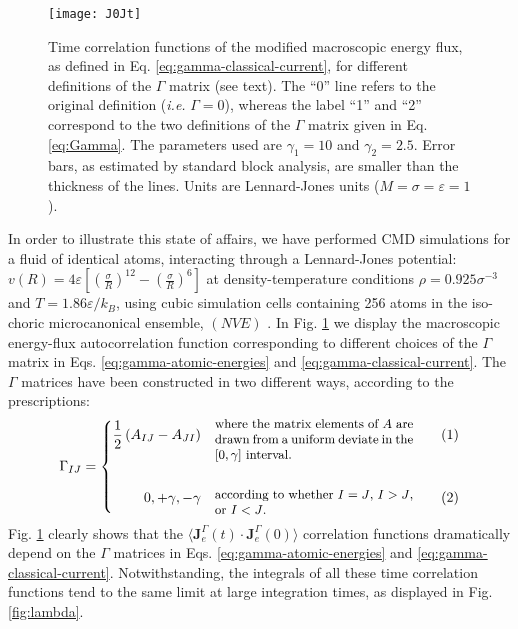 \begin{figure}
\centering \texttt{[image: J0Jt]}
\caption{Time correlation functions of the modified macroscopic energy
  flux, as defined in Eq. \eqref{eq:gamma-classical-current}, for
  different definitions of the $\Gamma$ matrix (see text). 
  The ``0'' line refers to the original definition (\emph{i.e.}
  $\Gamma = 0$), whereas the label ``1'' and ``2'' correspond to the
  two definitions of the $\Gamma$ matrix given in Eq. \eqref{eq:Gamma}.
  The parameters used are $\gamma_1 = 10$ and $\gamma_2 = 2.5$. 
  Error bars, as estimated by standard block analysis, are smaller 
  than the thickness of the lines. Units are Lennard-Jones units 
  ($M=\sigma=\varepsilon=1$). \label{fig:J0Jt} 
}
\end{figure}

In order to illustrate this state of affairs, we have performed CMD
simulations for a fluid of identical atoms, interacting through a
Lennard-Jones potential:
$v(R) = 4\varepsilon \left[ \left( \frac{\sigma}{R}\right)^{12} -
  \left(\frac{\sigma}{R} \right)^{6} \right]$
at density-temperature conditions $\rho=0.925\sigma^{-3}$ and
$T=1.86\varepsilon/k_{B}$, using cubic simulation cells containing 256
atoms in the iso-choric microcanonical ensemble, $(NVE)$
\cite{LAMMPS:1995}. In Fig. \ref{fig:J0Jt} we display the macroscopic energy-flux
autocorrelation function corresponding to different choices of the
$\Gamma$ matrix in Eqs. \eqref{eq:gamma-atomic-energies} and
\eqref{eq:gamma-classical-current}. 
The $\Gamma$ matrices have been constructed in two different ways,
according to the prescriptions:
\begin{equation}
\setbox0=\vbox{\hsize=50mm \small\noindent where the matrix
      elements of $A$ are drawn from a uniform deviate  in the
      $[0,\gamma]$ interval.}
\setbox1 \vbox{\hsize=50mm \small\noindent according to whether $I=J$,
  $I>J$, or $I<J$.}
\Gamma_{IJ}= \left \{
  \begin{alignedat}{2}
    \frac{1}{2} \left(A_{IJ}-A_{JI}\right ) & \quad\raise -.5\ht0
    \box0 && \qquad (1) \\
\\
    0, +\gamma, -\gamma & \quad\raise -0.5\ht1 \box1 && \qquad (2) \\
  \end{alignedat} \right .
\label{eq:Gamma}
\end{equation}
Fig. \ref{fig:J0Jt} clearly shows that the
$\langle \mathbf{J}_{e}^{\Gamma}(t) \cdot\mathbf{J}_{e}^{\Gamma}(0)
\rangle$
correlation functions dramatically depend on the $\Gamma$ matrices in
Eqs. \eqref{eq:gamma-atomic-energies} and
\eqref{eq:gamma-classical-current}.  Notwithstanding, the integrals of
all these time correlation functions tend to the same limit at large
integration times, as displayed in Fig. \ref{fig:lambda}.

